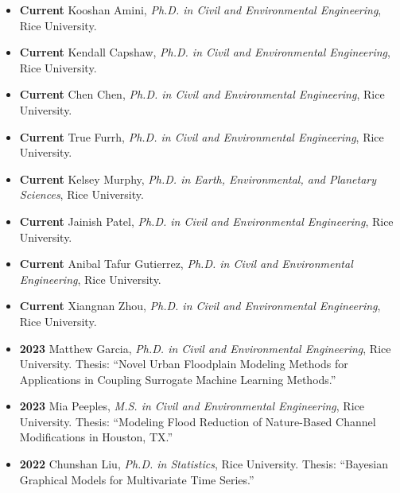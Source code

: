 \documentclass[10pt,oneside]{article}
\begin{document}
\mbox{}\vspace{-\dimexpr\baselineskip\relax}

\begin{itemize}[label={}]

  
    \item \textbf{Current} Kooshan Amini, \textit{Ph.D. in Civil and Environmental Engineering}, Rice University. 
  
    \item \textbf{Current} Kendall Capshaw, \textit{Ph.D. in Civil and Environmental Engineering}, Rice University. 
  
    \item \textbf{Current} Chen Chen, \textit{Ph.D. in Civil and Environmental Engineering}, Rice University. 
  
    \item \textbf{Current} True Furrh, \textit{Ph.D. in Civil and Environmental Engineering}, Rice University. 
  
    \item \textbf{Current} Kelsey Murphy, \textit{Ph.D. in Earth, Environmental, and Planetary Sciences}, Rice University. 
  
    \item \textbf{Current} Jainish Patel, \textit{Ph.D. in Civil and Environmental Engineering}, Rice University. 
  
    \item \textbf{Current} Anibal Tafur Gutierrez, \textit{Ph.D. in Civil and Environmental Engineering}, Rice University. 
  
    \item \textbf{Current} Xiangnan Zhou, \textit{Ph.D. in Civil and Environmental Engineering}, Rice University. 
  
  
  
    \item \textbf{2023} \quad Matthew Garcia, \textit{Ph.D. in Civil and Environmental Engineering}, Rice University. Thesis: \enquote{Novel Urban Floodplain Modeling Methods for Applications in Coupling Surrogate Machine Learning Methods.}
  
    \item \textbf{2023} \quad Mia Peeples, \textit{M.S. in Civil and Environmental Engineering}, Rice University. Thesis: \enquote{Modeling Flood Reduction of Nature-Based Channel Modifications in Houston, TX.}
  
    \item \textbf{2022} \quad Chunshan Liu, \textit{Ph.D. in Statistics}, Rice University. Thesis: \enquote{Bayesian Graphical Models for Multivariate Time Series.}
  

\end{itemize}
\end{document}
